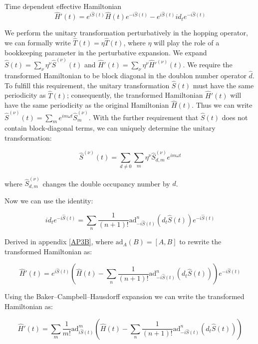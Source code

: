 \begin{section}{Time dependent effective Hamiltonian}
\begin{equation}
\hat{H}'(t) = e^{i\hat{S}(t)} \hat{H}(t) e^{-i\hat{S}(t)} - e^{i\hat{S}(t)} id_t e^{-i\hat{S}(t)}
\end{equation} 

We perform the unitary transformation perturbatively in the hopping operator, we can formally write $\hat{T}(t) = \eta \hat{T}(t)$, where $\eta$ will play the role of a bookkeeping parameter in the perturbative expansion. We expand $\hat{S}(t) = \sum_\nu \eta^\nu \hat{S}^{(\nu)}(t)$ and $\hat{H}'(t) = \sum_\nu \eta^\nu \hat{H}'^{(\nu)}(t)$. We require the transformed Hamiltonian to be block diagonal in the doublon number operator $\hat{d}$. To fulfill this requirement, the unitary transformation $\hat{S}(t)$ must have the same periodicity as $\hat{T}(t)$; consequently, the transformed Hamiltonian $\hat{H}'(t)$ will have the same periodicity as the original Hamiltonian $\hat{H}(t)$. Thus we can write $\hat{S}^{(\nu)}(t) = \sum_m e^{im\omega t}\hat{S}^{(\nu)}_m$. With the further requirement that $\hat{S}(t)$ does not contain block-diagonal terms, we can uniquely determine the unitary transformation:

\begin{equation}
\hat{S}^{(\nu)}(t) = \sum_{d \neq 0} \sum_m \eta^\nu \hat{S}^{(\nu)}_{d,m} e^{im\omega t}
\end{equation}

where $\hat{S}^{(\nu)}_{d,m}$ changes the double occupancy number by $d$.

Now we can use the identity:

\begin{equation}
id_t e^{-i\hat{S}(t)} = \sum_n \frac{1}{(n+1)!}\text{ad}_{-i\hat{S}(t)}^n (d_t \hat{S}(t))e^{-i\hat{S}(t)}
\end{equation}

Derived in appendix \ref{AP3B}, where $\text{ad}_A(B) = [A,B]$ to rewrite the transformed Hamiltonian as:

\begin{equation}
\hat{H}'(t) = e^{i\hat{S}(t)} \left( \hat{H}(t) - \sum_n \frac{1}{(n+1)!}\text{ad}_{-i\hat{S}(t)}^n (d_t \hat{S}(t)) \right) e^{-i\hat{S}(t)}
\end{equation}

Using the Baker–Campbell–Hausdorff expansion we can write the transformed Hamiltonian as:

\begin{equation}
\label{PertFull}
\hat{H}'(t) = \sum_m \frac{1}{m!} \text{ad}_{i\hat{S}(t)}^m \left( \hat{H}(t) - \sum_n \frac{1}{(n+1)!}\text{ad}_{-i\hat{S}(t)}^n (d_t \hat{S}(t)) \right)
\end{equation}


\end{section}
